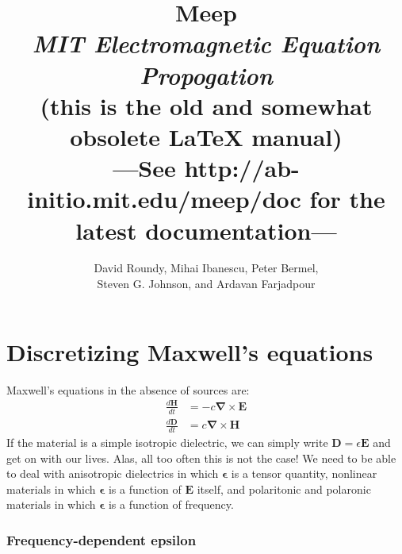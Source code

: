 \documentclass[floats]{book}
\begin{document}
\title{
    Meep\\
{\Large \it MIT Electromagnetic Equation Propogation}\\
{\Large (this is the old and somewhat obsolete {\LaTeX} manual)}\\
{\Large ---See http://ab-initio.mit.edu/meep/doc for the latest documentation---}
}
\author{
    David Roundy, Mihai Ibanescu, Peter Bermel, \\
    Steven G. Johnson, and Ardavan Farjadpour
}

\maketitle 

\tableofcontents

\chapter{Discretizing Maxwell's equations}

Maxwell's equations in the absence of sources are:
\begin{align}
\frac{d\mathbf H}{dt} &= -c \mathbf \nabla \times \mathbf E\\
\frac{d\mathbf D}{dt} &= c \mathbf \nabla \times \mathbf H
\end{align}
If the material is a simple isotropic dielectric, we can simply write
$\mathbf D = \epsilon \mathbf E$ and get on with our lives.  Alas, all too
often this is not the case!  We need to be able to deal with anisotropic
dielectrics in which $\mathbf \epsilon$ is a tensor quantity, nonlinear
materials in which $\mathbf \epsilon$ is a function of $\mathbf E$ itself,
and polaritonic and polaronic materials in which $\mathbf \epsilon$ is a
function of frequency.

\subsection{Frequency-dependent epsilon}
\end{document}
